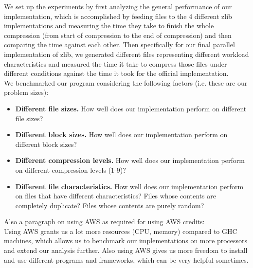 \documentclass[12pt]{article}
\begin{document}
    We set up the experiments by first analyzing the general performance of our implementation, which is accomplished by feeding files to the 4 different zlib implementations and measuring the time they take to finish the whole compression (from start of compression to the end of compression) and then comparing the time against each other. Then specifically for our final parallel implementation of zlib, we generated different files representing different workload characteristics and measured the time it take to compress those files under different conditions against the time it took for the official implementation.\\
    We benchmarked our program considering the following factors (i.e. these are our problem sizes):
    \begin{itemize}
        \item \textbf{Different file sizes.} How well does our implementation perform on different file sizes?
        \item \textbf{Different block sizes.} How well does our implementation perform on different block sizes?
        \item \textbf{Different compression levels.} How well does our implementation perform on different compression levels (1-9)?
        \item \textbf{Different file characteristics.} How well does our implementation perform on files that have different characteristics? Files whose contents are completely duplicate? Files whose contents are purely random?
    \end{itemize}
    Also a paragraph on using AWS as required for using AWS credits:\\
    Using AWS grants us a lot more resources (CPU, memory) compared to GHC machines, which allows us to benchmark our implementations on more processors and extend our analysis further. Also using AWS gives us more freedom to install and use different programs and frameworks, which can be very helpful sometimes.
\end{document}
